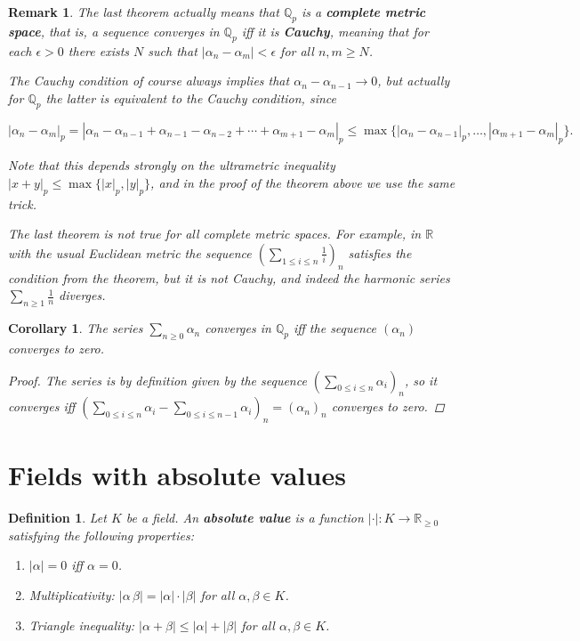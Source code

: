 \documentclass{article}
\newcommand{\term}{\textbf}
\newcommand{\QQ}{\mathbb{Q}}
\theoremstyle{myplain}
\newtheorem{corollary}[proposition]{Corollary}
\theoremstyle{mydefinition}
\newtheorem{definition}[proposition]{Definition}
\newtheorem{remark}[proposition]{Remark}
\begin{document}
\begin{remark}
  The last theorem actually means that $\QQ_p$ is a
  \term{complete metric space}, that is, a sequence converges in $\QQ_p$ iff it
  is \term{Cauchy}, meaning that for each $\epsilon > 0$ there exists $N$ such
  that $|\alpha_n - \alpha_m| < \epsilon$ for all $n,m \ge N$.

  The Cauchy condition of course always implies that
  $\alpha_n - \alpha_{n-1} \to 0$, but actually for $\QQ_p$ the latter is
  \emph{equivalent} to the Cauchy condition, since

  \[ |\alpha_n - \alpha_m|_p =
    |\alpha_n - \alpha_{n-1} + \alpha_{n-1} - \alpha_{n-2} + \cdots + \alpha_{m+1} - \alpha_m|_p \le
    \max \{ |\alpha_n - \alpha_{n-1}|_p, \ldots, |\alpha_{m+1} - \alpha_m|_p \}. \]

  Note that this depends strongly on the ultrametric inequality
  $|x + y|_p \le \max \{ |x|_p, |y|_p \}$, and in the proof of the theorem above
  we use the same trick.

  The last theorem is \emph{not} true for all complete metric spaces.
  For example, in $\mathbb{R}$ with the usual Euclidean metric the sequence
  $(\sum_{1 \le i \le n} \frac{1}{i})_n$ satisfies the condition from the
  theorem, but it is not Cauchy, and indeed the harmonic series
  $\sum_{n\ge 1} \frac{1}{n}$ diverges.
\end{remark}

\begin{corollary}
  The series $\sum_{n \ge 0} \alpha_n$ converges in $\QQ_p$ iff the sequence
  $(\alpha_n)$ converges to zero.

  \begin{proof}
    The series is by definition given by the sequence
    $(\sum_{0 \le i \le n} \alpha_i)_n$, so it converges iff
    $(\sum_{0 \le i \le n} \alpha_i - \sum_{0 \le i \le n-1} \alpha_i)_n = (\alpha_n)_n$
    converges to zero.
  \end{proof}
\end{corollary}

\section{Fields with absolute values}

\begin{definition}
  Let $K$ be a field. An \term{absolute value} is a function
  $|\cdot|\colon K\to \mathbb{R}_{\ge 0}$ satisfying the following properties:

  \begin{enumerate}
  \item $|\alpha| = 0$ iff $\alpha = 0$.

  \item Multiplicativity: $|\alpha\,\beta| = |\alpha|\cdot |\beta|$ for all
    $\alpha,\beta\in K$.

  \item Triangle inequality: $|\alpha + \beta| \le |\alpha| + |\beta|$ for all
    $\alpha,\beta\in K$.
  \end{enumerate}
\end{definition}
\end{document}
